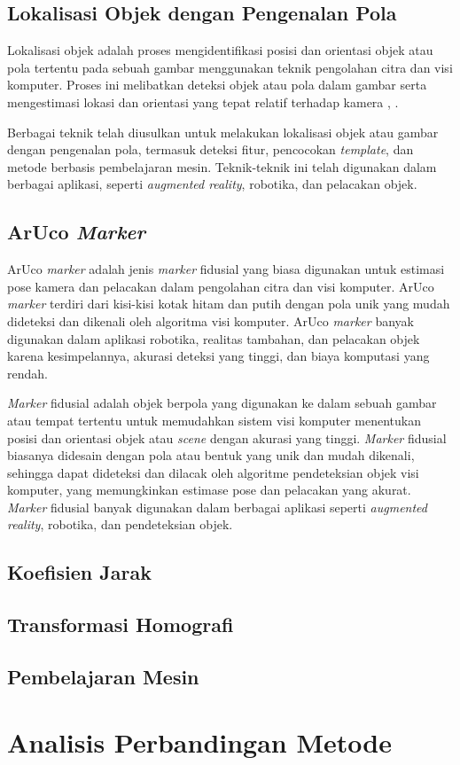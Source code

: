 \subsection{Lokalisasi Objek dengan Pengenalan Pola}
Lokalisasi objek adalah proses mengidentifikasi posisi dan orientasi objek atau pola tertentu pada sebuah gambar menggunakan teknik pengolahan citra dan visi komputer. Proses ini melibatkan deteksi objek atau pola dalam gambar serta mengestimasi lokasi dan orientasi yang tepat relatif terhadap kamera \cite{sivic2003video}, \cite{}.

Berbagai teknik telah diusulkan untuk melakukan lokalisasi objek atau gambar dengan pengenalan pola, termasuk deteksi fitur, pencocokan \emph{template}, dan metode berbasis pembelajaran mesin. Teknik-teknik ini telah digunakan dalam berbagai aplikasi, seperti \emph{augmented reality}, robotika, dan pelacakan objek.

\subsection{ArUco \emph{Marker}}
ArUco \emph{marker} adalah jenis \emph{marker} fidusial yang biasa digunakan untuk estimasi pose kamera dan pelacakan dalam pengolahan citra dan visi komputer. ArUco \emph{marker} terdiri dari kisi-kisi kotak hitam dan putih dengan pola unik yang mudah dideteksi dan dikenali oleh algoritma visi komputer. ArUco \emph{marker} banyak digunakan dalam aplikasi robotika, realitas tambahan, dan pelacakan objek karena kesimpelannya, akurasi deteksi yang tinggi, dan biaya komputasi yang rendah.

\emph{Marker} fidusial adalah objek berpola yang digunakan ke dalam sebuah gambar atau tempat tertentu untuk memudahkan sistem visi komputer menentukan posisi dan orientasi objek atau \emph{scene} dengan akurasi yang tinggi. \emph{Marker} fidusial biasanya didesain dengan pola atau bentuk yang unik dan mudah dikenali, sehingga dapat dideteksi dan dilacak oleh algoritme pendeteksian objek visi komputer, yang memungkinkan estimase pose dan pelacakan yang akurat. \emph{Marker} fidusial banyak digunakan dalam berbagai aplikasi seperti \emph{augmented reality}, robotika, dan pendeteksian objek.


\subsection{Koefisien Jarak}

\subsection{Transformasi Homografi}

\subsection{Pembelajaran Mesin}

\section{Analisis Perbandingan Metode}